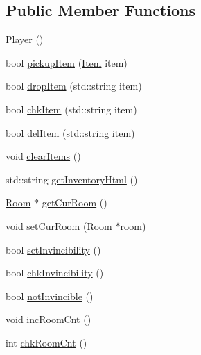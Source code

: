 \subsection*{Public Member Functions}
\begin{DoxyCompactItemize}
\item 
\hyperlink{class_player_affe0cc3cb714f6deb4e62f0c0d3f1fd8}{Player} ()
\item 
bool \hyperlink{class_player_af2cde98e3e3016f52bcec03c56aec407}{pickup\+Item} (\hyperlink{class_item}{Item} item)
\item 
bool \hyperlink{class_player_adb4031aaf2536a5a7f89e7d194d990e2}{drop\+Item} (std\+::string item)
\item 
bool \hyperlink{class_player_a8c1c3b5c6c5477f32309e93a63b386ff}{chk\+Item} (std\+::string item)
\item 
bool \hyperlink{class_player_a081bbb9e703f1f32eeaa3f9aac6ac327}{del\+Item} (std\+::string item)
\item 
void \hyperlink{class_player_ad6b1c30ffa56aacefb102195a041577d}{clear\+Items} ()
\item 
std\+::string \hyperlink{class_player_ab21f29bdef7ec29545dbb45f2a166ab0}{get\+Inventory\+Html} ()
\item 
\hyperlink{class_room}{Room} $\ast$ \hyperlink{class_player_aa19bb311c830a1e886609eb53502d0b0}{get\+Cur\+Room} ()
\item 
void \hyperlink{class_player_a2e90aee69f3d694edf944d5550fe73f9}{set\+Cur\+Room} (\hyperlink{class_room}{Room} $\ast$room)
\item 
bool \hyperlink{class_player_aebb3bc5a8d6dcbd27acf67ebd4ca6629}{set\+Invincibility} ()
\item 
bool \hyperlink{class_player_aaed2208fc599e76484fde37c38449cb1}{chk\+Invincibility} ()
\item 
bool \hyperlink{class_player_a86a98bb13b3a62ef59742ccb98ad3af5}{not\+Invincible} ()
\item 
void \hyperlink{class_player_a0ddbb83f6ed54aff1818a5f49291f644}{inc\+Room\+Cnt} ()
\item 
int \hyperlink{class_player_a842a4d1798d51aa4e9c4aa31868fe1a6}{chk\+Room\+Cnt} ()
\end{DoxyCompactItemize}

